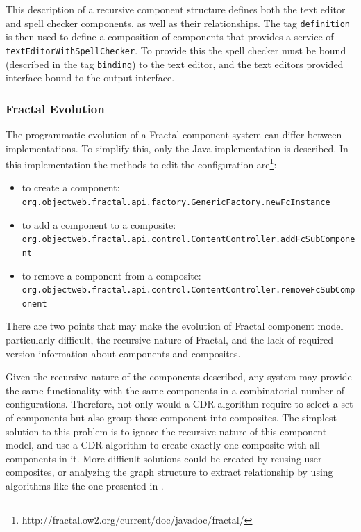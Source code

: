 This description of a recursive component structure defines both the text editor and spell checker components, as well as their relationships.
The tag \verb+definition+ is then used to define a composition of components that provides a service of \verb+textEditorWithSpellChecker+.
To provide this the spell checker must be bound (described in the tag \verb+binding+) to the text editor,
and the text editors provided interface bound to the output interface. 

\subsubsection{Fractal Evolution}
The programmatic evolution of a Fractal component system can differ between implementations.
To simplify this, only the Java implementation is described. 
In this implementation the methods to edit the configuration are\footnote{http://fractal.ow2.org/current/doc/javadoc/fractal/}:
\begin{itemize}
  \item to create a component: \verb+org.objectweb.fractal.api.factory.GenericFactory.newFcInstance+
  \item to add a component to a composite: \verb+org.objectweb.fractal.api.control.ContentController.addFcSubComponent+
  \item to remove a component from a composite: \verb+org.objectweb.fractal.api.control.ContentController.removeFcSubComponent+
\end{itemize}

There are two points that may make the evolution of Fractal component model particularly difficult,
the recursive nature of Fractal, and the lack of required version information about components and composites.

Given the recursive nature of the components described, any system may provide the same functionality with the same components in a combinatorial number of configurations.
Therefore, not only would a CDR algorithm require to select a set of components but also group those component into composites.
The simplest solution to this problem is to ignore the recursive nature of this component model,
and use a CDR algorithm to create exactly one composite with all components in it.
More difficult solutions could be created by reusing user composites,
or analyzing the graph structure to extract relationship by using algorithms like the one presented in \cite{dietrich2008cluster}.

